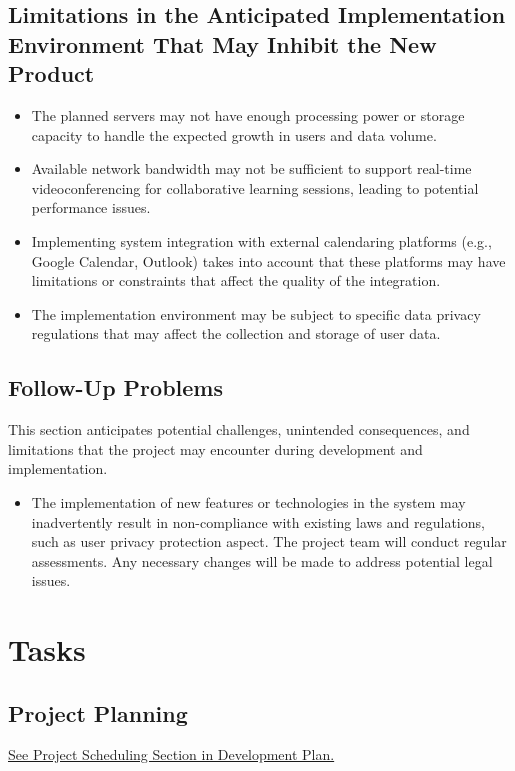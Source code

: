 \documentclass[12pt]{article}
\begin{document}
\subsection{Limitations in the Anticipated Implementation Environment That May
Inhibit the New Product}
\begin{itemize}
    \item The planned servers may not have enough processing power or storage capacity to handle the expected growth in users and data volume.
    
    \item Available network bandwidth may not be sufficient to support real-time videoconferencing for collaborative learning sessions, leading to potential performance issues.
    
    \item Implementing system integration with external calendaring platforms (e.g., Google Calendar, Outlook) takes into account that these platforms may have limitations or constraints that affect the quality of the integration.
    
    \item The implementation environment may be subject to specific data privacy regulations that may affect the collection and storage of user data.
\end{itemize}

\subsection{Follow-Up Problems}
This section anticipates potential challenges, unintended consequences, and limitations that the project may encounter during development and implementation.

\begin{itemize}
    \item The implementation of new features or technologies in the system may inadvertently result in non-compliance with existing laws and regulations, such as user privacy protection aspect. The project team will conduct regular assessments. Any necessary changes will be made to address potential legal issues.
\end{itemize}

\section{Tasks}
\subsection{Project Planning}
\href{https://github.com/wangq131/4G06CapstoneProjectT5/blob/main/docs/DevelopmentPlan/DevelopmentPlan.tex#L248C1-L265C6}{See Project Scheduling Section in Development Plan.}
\end{document}
